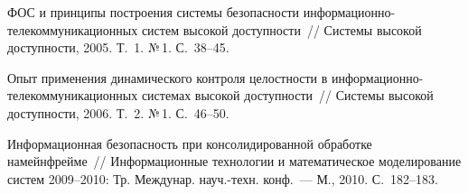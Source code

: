 \begin{multicols}{2}
{{\begin{thebibliography}{99}
ФОС и принципы построения сис\-те\-мы безопасности 
ин\-фор\-ма\-ци\-он\-но-те\-ле\-ком\-му\-ни\-ка\-ци\-он\-ных сис\-тем высокой 
доступности~// Системы высокой доступности, 2005. Т.~1. №\,1. С.~38--45.

Опыт применения динамического контроля целостности в 
ин\-фор\-ма\-ци\-он\-но-те\-ле\-ком\-му\-ни\-ка\-ци\-он\-ных сис\-те\-мах высокой 
доступности~// Системы высокой доступности, 2006. Т.~2. №\,1. С.~46--50.

\label{end\stat}

Информационная безопас\-ность при консолидированной обработке на\linebreak мейнфрейме~// 
Информационные технологии и математическое моделирование сис\-тем 2009--2010: Тр. 
Междунар. науч.-техн. конф.~--- М., 2010. С.~182--183.
 \end{thebibliography}
}
}


\end{multicols}